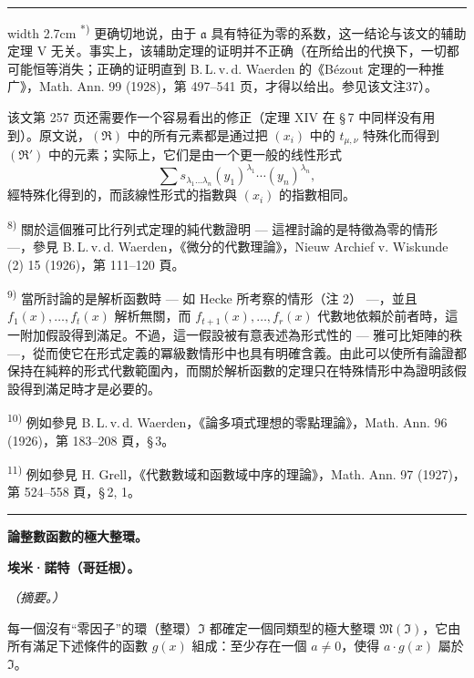 \documentclass[11pt]{article}
\begin{document}
{\medskip
\hrule width 2.7cm
\smallskip
\noindent\textsuperscript{*)} 更确切地说，由于 $\mathfrak{a}$ 具有特征为零的系数，这一结论与该文的辅助定理 V 无关。事实上，该辅助定理的证明并不正确（在所给出的代换下，一切都可能恒等消失；正确的证明直到 B.\,L.\,v.\,d. Waerden 的《Bézout 定理的一种推广》，Math. Ann. 99 (1928)，第 497--541 页，才得以给出。参见该文注37）。

该文第 257 页还需要作一个容易看出的修正（定理 XIV 在 \S\,7 中同样没有用到）。原文说，$(\mathfrak{R})$ 中的所有元素都是通过把 $(x_i)$ 中的 $t_{\mu,\nu}$ 特殊化而得到 $(\mathfrak{R}')$ 中的元素；实际上，它们是由一个更一般的线性形式
\[
\sum s_{\lambda_1\ldots\lambda_n}(y_1)^{\lambda_1}\cdots(y_n)^{\lambda_n},
\]
經特殊化得到的，而該線性形式的指數與 $(x_i)$ 的指數相同。

\noindent\textsuperscript{8)} 關於這個雅可比行列式定理的純代數證明 --- 這裡討論的是特徵為零的情形 ---，參見 B.\,L.\,v.\,d. Waerden，《微分的代數理論》，Nieuw Archief v. Wiskunde (2) 15 (1926)，第 111--120 頁。

\noindent\textsuperscript{9)} 當所討論的是解析函數時 --- 如 Hecke 所考察的情形（注 2） ---，並且 $f_1(x),\ldots,f_t(x)$ 解析無關，而 $f_{t+1}(x),\ldots,f_r(x)$ 代數地依賴於前者時，這一附加假設得到滿足。不過，這一假設被有意表述為形式性的 --- 雅可比矩陣的秩 ---，從而使它在形式定義的冪級數情形中也具有明確含義。由此可以使所有論證都保持在純粹的形式代數範圍內，而關於解析函數的定理只在特殊情形中為證明該假設得到滿足時才是必要的。

\noindent\textsuperscript{10)} 例如參見 B.\,L.\,v.\,d. Waerden，《論多項式理想的零點理論》，Math. Ann. 96 (1926)，第 183--208 頁，\S\,3。

\noindent\textsuperscript{11)} 例如參見 H. Grell，《代數數域和函數域中序的理論》，Math. Ann. 97 (1927)，第 524--558 頁，\S\,2, 1。
}

\bigskip
\begin{center}\rule{4cm}{0.4pt}\end{center}
\begingroup
{}
\begin{center}
{\Large\bfseries 論整數函數的極大整環。}\par
\vspace{0.7em}
{\bfseries 埃米·諾特（哥廷根）。}\par
\vspace{0.5em}
\emph{（摘要。）}
\end{center}

每一個沒有“零因子”的環（整環）$\mathfrak{I}$ 都確定一個同類型的極大整環 $\mathfrak{M}(\mathfrak{I})$，它由所有滿足下述條件的函數 $g(x)$ 組成：至少存在一個 $a\ne0$，使得 $a\cdot g(x)$ 屬於 $\mathfrak{I}$。
\end{document}
